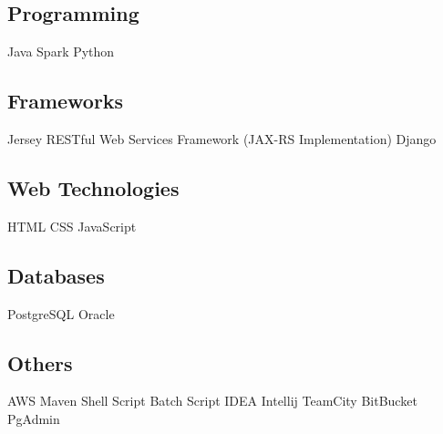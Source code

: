 \documentclass[]{deedy-resume-openfont}
\begin{document}
\begin{minipage}[t]{0.33\textwidth}
\subsection{Programming}
Java \textbullet{} Spark \textbullet{} Python\\
\sectionsep
\subsection{Frameworks}
Jersey RESTful Web Services Framework (JAX-RS Implementation)\textbullet{} Django
\sectionsep
\subsection{Web Technologies}
HTML \textbullet{} CSS \textbullet{} JavaScript
\sectionsep
\subsection{Databases}
PostgreSQL \textbullet{} Oracle \textbullet{}
\sectionsep
\subsection{Others}
AWS \textbullet{} Maven \textbullet{} Shell Script \textbullet{} Batch Script \textbullet{} IDEA Intellij \textbullet{} TeamCity\textbullet{} BitBucket \textbullet{} PgAdmin

%
%

\end{minipage} 
\hfill
\end{document}
